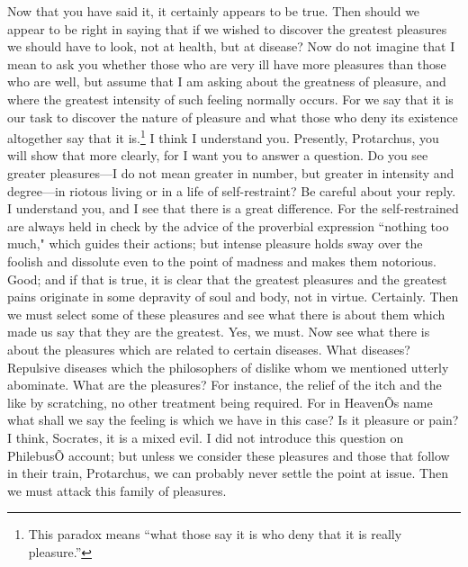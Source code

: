 \documentclass[letterpaper,12pt]{article}
\newcommand{\stephpag}[1]{\marginnote{\small\itshape\fontfamily{ppl}\selectfont #1}}
\begin{document}
\begin{drama}
\protarchusspeaks
Now that you have said it, it certainly appears to be true.
\socratesspeaks
Then should we appear to be right in saying that if we wished to discover the greatest pleasures we should have to look, not at health, but at disease? Now do not imagine that I mean to ask you whether those who are very ill have more pleasures than those who are well, but assume that I am asking about the greatness of pleasure, and where the greatest intensity of such feeling normally occurs. For we say that it is our task to discover the nature of pleasure and what \stephpag{d} those who deny its existence altogether say that it is.\footnote{This paradox means ``what those say it is who deny that it is really pleasure.''}
\protarchusspeaks
I think I understand you.
\socratesspeaks
Presently, Protarchus, you will show that more clearly, for I want you to answer a question. Do you see greater pleasures---I do not mean greater in number, but greater in intensity and degree---in riotous living or in a life of self-restraint? Be careful about your reply.
\protarchusspeaks
I understand you, and I see that there is a great difference. For the self-restrained are always held in check by the advice of the proverbial expression \stephpag{e} ``nothing too much," which guides their actions; but intense pleasure holds sway over the foolish and dissolute even to the point of madness and makes them notorious.
\socratesspeaks
Good; and if that is true, it is clear that the greatest pleasures and the greatest pains originate in some depravity of soul and body, not in virtue.
\protarchusspeaks
Certainly.
\socratesspeaks
Then we must select some of these pleasures and see what there is about them which made us say that they are the greatest. \stephpag{46 a}
\protarchusspeaks
Yes, we must.
\socratesspeaks
Now see what there is about the pleasures which are related to certain diseases.
\protarchusspeaks
What diseases?
\socratesspeaks
Repulsive diseases which the philosophers of dislike whom we mentioned utterly abominate.
\protarchusspeaks
What are the pleasures?
\socratesspeaks
For instance, the relief of the itch and the like by scratching, no other treatment being required. For in HeavenÕs name what shall we say the feeling is which we have in this case? Is it pleasure or pain?
\protarchusspeaks
I think, Socrates, it is a mixed evil. \stephpag{b}
\socratesspeaks
I did not introduce this question on PhilebusÕ account; but unless we consider these pleasures and those that follow in their train, Protarchus, we can probably never settle the point at issue.
\protarchusspeaks
Then we must attack this family of pleasures.

\end{drama}
\end{document}
